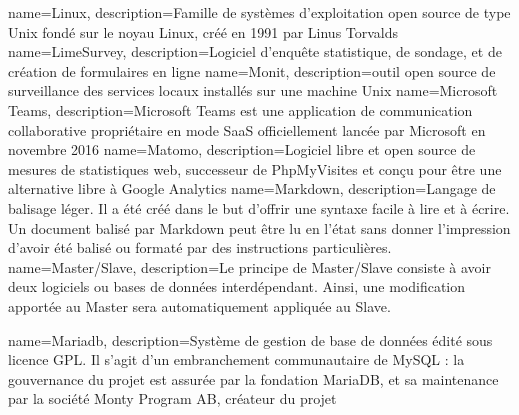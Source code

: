 {
    name=Linux,
    description={Famille de systèmes d'exploitation open source de type Unix fondé sur le noyau Linux, créé en 1991 par Linus Torvalds}
}
{
    name=LimeSurvey,
    description={Logiciel d'enquête statistique, de sondage, et de création de formulaires en ligne}
}
{
    name=Monit,
    description={outil open source de surveillance des services locaux installés sur une machine Unix}
}
{
    name=Microsoft Teams,
    description={Microsoft Teams est une application de communication collaborative propriétaire en mode SaaS officiellement lancée par Microsoft en novembre 2016}
}
{
    name=Matomo,
    description={Logiciel libre et open source de mesures de statistiques web, successeur de PhpMyVisites et conçu pour être une alternative libre à Google Analytics}
}
{
    name=Markdown,
    description={Langage de balisage léger. Il a été créé dans le but d'offrir une syntaxe facile à lire et à écrire. Un document balisé par Markdown peut être lu en l'état sans donner l’impression d'avoir été balisé ou formaté par des instructions particulières.}
}
{
    name=Master/Slave,
    description={Le principe de Master/Slave consiste à avoir deux logiciels ou bases de données interdépendant. Ainsi, une modification apportée au Master sera automatiquement appliquée au Slave.}
}

{
    name=Mariadb,
    description={Système de gestion de base de données édité sous licence GPL. Il s'agit d'un embranchement communautaire de MySQL : la gouvernance du projet est assurée par la fondation MariaDB, et sa maintenance par la société Monty Program AB, créateur du projet}
}


